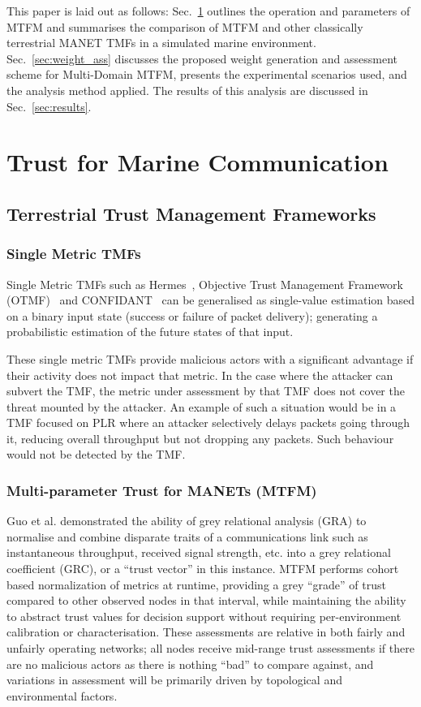 \documentclass[conference]{IEEEtran}
\begin{document}
This paper is laid out as follows: Sec.~\ref{sec:mtfm} outlines the operation and parameters of MTFM and summarises the comparison of MTFM and other classically terrestrial MANET TMFs in a simulated marine environment.
Sec.~\ref{sec:weight_ass} discusses the proposed weight generation and assessment scheme for Multi-Domain MTFM, presents the experimental scenarios used, and the analysis method applied.
The results of this analysis are discussed in Sec.~\ref{sec:results}.

\section{Trust for Marine Communication}\label{sec:mtfm}

\subsection{Terrestrial Trust Management Frameworks}

\subsubsection{Single Metric TMFs}

Single Metric TMFs such as Hermes~\cite{Zouridaki2005}, Objective Trust Management Framework (OTMF)~\cite{Li2008} and CONFIDANT~\cite{Buchegger2002} can be generalised as single-value estimation based on a binary input state (success or failure of packet delivery); generating a probabilistic estimation of the future states of that input. 

These single metric TMFs provide malicious actors with a significant advantage if their activity does not impact that metric.
In the case where the attacker can subvert the TMF, the metric under assessment by that TMF does not cover the threat mounted by the attacker.
An example of such a situation would be in a TMF focused on PLR where an attacker selectively delays packets going through it, reducing overall throughput but not dropping any packets.
Such behaviour would not be detected by the TMF.

\subsubsection{Multi-parameter Trust for MANETs (MTFM)}

Guo et al. \cite{Guo11} demonstrated the ability of grey relational analysis (GRA) \cite{Zuo1995} to normalise and combine disparate traits of a communications link such as instantaneous throughput, received signal strength, etc. into a grey relational coefficient (GRC), or a ``trust vector'' in this instance.
MTFM performs cohort based normalization of metrics at runtime, providing a grey ``grade'' of trust compared to other observed nodes in that interval, while maintaining the ability to abstract trust values for decision support without requiring per-environment calibration or characterisation.
These assessments are relative in both fairly and unfairly operating networks; all nodes receive mid-range trust assessments if there are no malicious actors as there is nothing ``bad'' to compare against, and variations in assessment will be primarily driven by topological and environmental factors.
\end{document}
